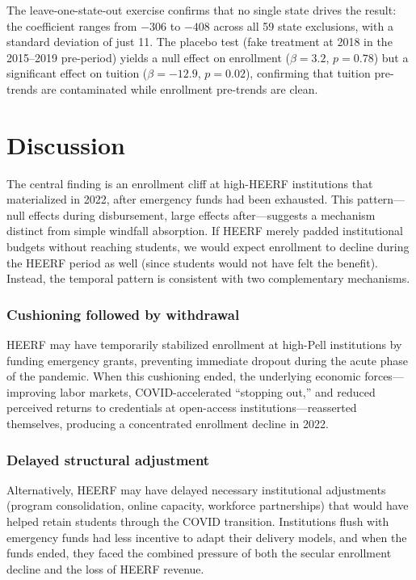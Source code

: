 \documentclass[12pt]{article}
\begin{document}
The leave-one-state-out exercise confirms that no single state drives the result: the coefficient ranges from $-306$ to $-408$ across all 59 state exclusions, with a standard deviation of just 11. The placebo test (fake treatment at 2018 in the 2015--2019 pre-period) yields a null effect on enrollment ($\beta = 3.2$, $p = 0.78$) but a significant effect on tuition ($\beta = -12.9$, $p = 0.02$), confirming that tuition pre-trends are contaminated while enrollment pre-trends are clean.

\section{Discussion}

The central finding is an enrollment cliff at high-HEERF institutions that materialized in 2022, after emergency funds had been exhausted. This pattern---null effects during disbursement, large effects after---suggests a mechanism distinct from simple windfall absorption. If HEERF merely padded institutional budgets without reaching students, we would expect enrollment to decline during the HEERF period as well (since students would not have felt the benefit). Instead, the temporal pattern is consistent with two complementary mechanisms.

\subsubsection*{Cushioning followed by withdrawal} HEERF may have temporarily stabilized enrollment at high-Pell institutions by funding emergency grants, preventing immediate dropout during the acute phase of the pandemic. When this cushioning ended, the underlying economic forces---improving labor markets, COVID-accelerated ``stopping out,'' and reduced perceived returns to credentials at open-access institutions---reasserted themselves, producing a concentrated enrollment decline in 2022.

\subsubsection*{Delayed structural adjustment} Alternatively, HEERF may have delayed necessary institutional adjustments (program consolidation, online capacity, workforce partnerships) that would have helped retain students through the COVID transition. Institutions flush with emergency funds had less incentive to adapt their delivery models, and when the funds ended, they faced the combined pressure of both the secular enrollment decline and the loss of HEERF revenue.
\end{document}
